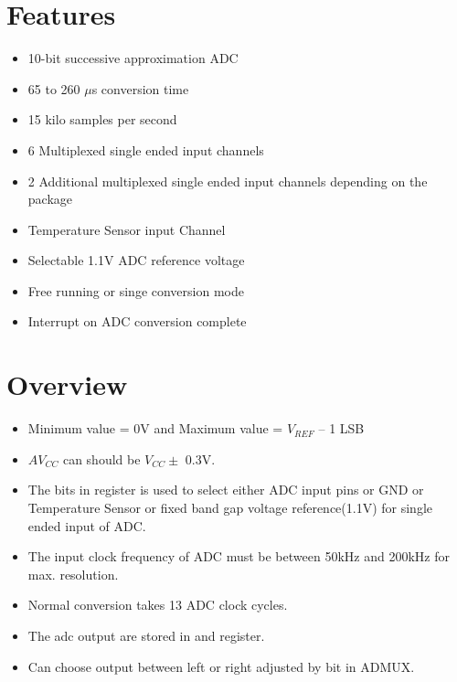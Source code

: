 


% 

\section{Features}
\begin{itemize}
    \item 10-bit successive approximation ADC
    \item 65 to 260 $\mu$s conversion time
    \item 15 kilo samples per second
    \item 6 Multiplexed single ended input channels
    \item 2 Additional multiplexed single ended input channels depending on the package
    \item Temperature Sensor input Channel
    \item Selectable 1.1V ADC reference voltage
    \item Free running or singe conversion mode
    \item Interrupt on ADC conversion complete
\end{itemize}
\section{Overview}
\begin{itemize}
    \item Minimum value = 0V and Maximum value = $V_{REF}$ – 1 LSB
    \item $AV_{CC}$ can should be $V_{CC} \pm$ 0.3V.
    \item The  bits in  register is used to select either ADC input pins or GND or Temperature Sensor or fixed band gap voltage reference(1.1V) for single ended input of ADC.
    \item The input clock frequency of ADC must be between 50kHz and 200kHz for max. resolution.
    \item Normal conversion takes 13 ADC clock cycles.
    \item The adc output are stored in  and  register.
    \item Can choose output between left or right adjusted by  bit in ADMUX.
\end{itemize}

